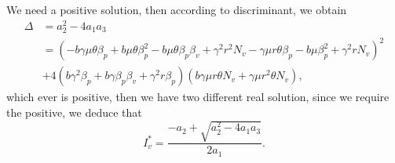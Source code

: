 We need a positive solution, then according to discriminant, we obtain
\begin{equation*}
	\begin{aligned}
		\Delta &= a_2^2-4a_1 a_3
		\\
		&=
			(
				- b \gamma \mu \theta \beta_p +
				b \mu \theta \beta_p^2 -
				b \mu \theta \beta_p \beta_v + 
				\gamma ^ 2 r ^ 2 N_v - 
				\gamma \mu r \theta \beta_p - 
				b \mu \beta_p ^ 2 + 
				\gamma ^ 2 r N_v 
			) ^ 2
		\\
		& +  
		4 ( 
			b \gamma ^ 2 \beta_p + 
			b \gamma \beta_p
			\beta_v + 
			\gamma^2 r \beta_p
		)
		(
			b \gamma \mu r \theta N_v + 
			\gamma \mu r ^ 2 \theta N_v
		),			
	\end{aligned}	
\end{equation*}
which ever is positive, then we have two different real solution, 
since we require the positive, we deduce that
\begin{equation*}
	I^*_v = \frac{-a_2+\sqrt{a_2^2-4a_1 a_3}}{2a_1}.
\end{equation*}